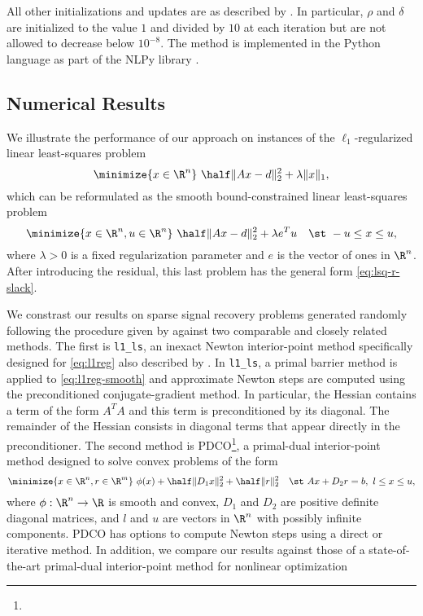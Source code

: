 \documentclass{amsart}
\begin{document}
All other initializations and updates are as described by
\cite{friedlander-orban-2012}. In particular, $\rho$ and $\delta$ are
initialized to the value $1$ and divided by $10$ at each iteration but are not
allowed to decrease below $10^{-8}$. The method is implemented in the Python
language as part of the \textsf{NLPy} library \citep{orban-2012}.

\subsection{Numerical Results}

We illustrate the performance of our approach on instances of the
$\ell_1$-regularized linear least-squares problem
\begin{equation}
  \label{eq:l1reg}
  \minimize{x \in \R^n} \ \half \|Ax - d\|_2^2 + \lambda \|x\|_1,
\end{equation}
which can be reformulated as the smooth bound-constrained linear least-squares
problem
\begin{equation}
  \label{eq:l1reg-smooth}
  \minimize{x \in \R^n, u \in \R^n} \ \half \|Ax - d\|_2^2 + \lambda e^T u
  \quad
  \st \ -u \leq x \leq u,
\end{equation}
where $\lambda > 0$ is a fixed regularization parameter and $e$ is the vector
of ones in $\R^n$. After introducing the residual, this last problem has the
general form \eqref{eq:lsq-r-slack}.

We constrast our results on sparse signal recovery problems generated randomly
following the procedure given by \cite{kim-koh-lustig-boyd-gorinevsky-2007}
against two comparable and closely related methods. The first is
\texttt{l1\_ls}, an inexact Newton interior-point method specifically designed
for \eqref{eq:l1reg} also described by
\cite{kim-koh-lustig-boyd-gorinevsky-2007}. In \texttt{l1\_ls}, a primal
barrier method is applied to \eqref{eq:l1reg-smooth} and approximate Newton
steps are computed using the preconditioned conjugate-gradient method. In
particular, the Hessian contains a term of the form $A^T A$ and this term is
preconditioned by its diagonal. The remainder of the Hessian consists in
diagonal terms that appear directly in the preconditioner. The second method
is PDCO\footnote{}, a
primal-dual interior-point method designed to solve convex problems of the
form
\begin{equation}
  \label{eq:prob-pdco}
  \minimize{x \in \R^n, r \in \R^m} \
  \phi(x) + \half \|D_1 x\|^2_2 + \half \|r\|_2^2
  \quad
  \st \ Ax + D_2 r = b, \ l \leq x \leq u,
\end{equation}
where $\phi: \R^n \to \R$ is smooth and convex, $D_1$ and $D_2$ are positive
definite diagonal matrices, and $l$ and $u$ are vectors in $\R^n$ with
possibly infinite components. PDCO has options to compute Newton steps using a
direct or iterative method. In addition, we compare our results against those of a state-of-the-art primal-dual interior-point method for nonlinear optimization
\end{document}
